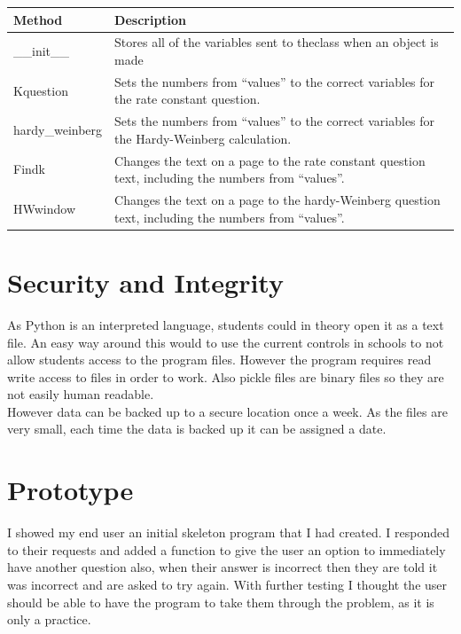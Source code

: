\documentclass[a4paper,12pt]{report}
\begin{document}
\begin{center}
\tablefirsthead{}
\tablehead{}
\tabletail{}
\tablelasttail{}
\begin{supertabular}{|m{3.38376in}|m{3.38376in}|}
\hline
Method &
Description\\\hline
\_\_init\_\_ &
Stores  all  of  the  variables  sent  to  theclass when an object is made
\\\hline
Kquestion &
Sets the numbers from ``values'' to the correct variables for the rate constant question.\\\hline
hardy\_weinberg &
Sets the numbers from ``values'' to the correct variables for the Hardy-Weinberg calculation.\\\hline
Findk &
Changes the text on a page to the rate constant question text, including the numbers from ``values''.\\\hline
HWwindow &
Changes the text on a page to the hardy-Weinberg question text, including the numbers from ``values''.\\\hline
\end{supertabular}
\end{center}
\section{Security and Integrity}


\bigskip

As Python is an interpreted language, students could in theory open it as a text file. An easy way around this would to use the current controls in schools to not allow students access to the program files. However the program requires read write access to files in order to work. Also pickle files are binary files so they are not easily human readable. \\ However data can be backed up to a secure location once a week. As the files are very small, each time the data is backed up it can be assigned a date.


\bigskip


\bigskip


\bigskip

\section{Prototype}


\bigskip

I showed my end user an initial skeleton program that I had created. I responded to their requests and added a function to give the user an option to immediately have another question also, when their answer is incorrect then they are told it was incorrect and are asked to try again. With further testing I thought the user should be able to have the program to take them through the problem, as it is only a practice.
\end{document}
